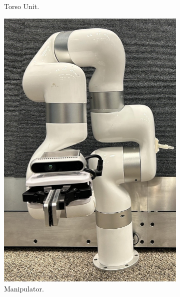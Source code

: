 \documentclass[runningheads,a4paper]{llncs}
\begin{document}
\begin{figure}[tbp]
\begin{minipage}[b]{0.25\linewidth}
\begin{subfigure}[b]{\linewidth}
			\caption{Torso Unit.}
			\label{fig:component_torso}
		\end{subfigure}
	\end{minipage}
	\hspace{0.01\linewidth}
	\begin{minipage}[b]{0.25\linewidth}
		\centering
		\begin{subfigure}[b]{\linewidth}
			\includegraphics[width=\linewidth]{images/component_manipulator.png}
			\caption{Manipulator.}
			\label{fig:component_arm}
		\end{subfigure}
		\begin{subfigure}[b]{\linewidth}

\end{subfigure}
\end{minipage}
\end{figure}
\end{document}
